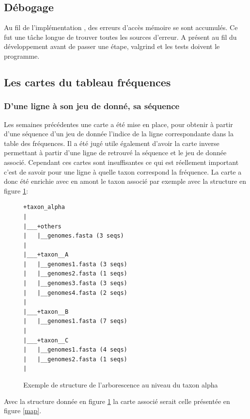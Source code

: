 \subsection{Débogage}

Au fil de l'implémentation , des erreurs d'accès mémoire se sont accumulés. Ce fut une tâche longue de trouver toutes les sources d'erreur. A présent au fil du développement avant de passer une étape, valgrind et les tests doivent le programme. 

\subsection{Les cartes du tableau fréquences}

\subsubsection{D'une ligne à son jeu de donné, sa séquence}
Les semaines précédentes une carte a été mise en place, pour obtenir à partir d'une séquence d'un jeu de donnée l'indice de la ligne correspondante dans la table des fréquences.
Il a été jugé utile également d'avoir la carte inverse permettant à partir d'une ligne de retrouvé la séquence et le jeu de donnée associé. Cependant ces cartes sont insuffisantes ce qui est réellement important c'est de savoir pour une ligne à quelle taxon correspond la fréquence. La carte a donc été enrichie avec en amont le taxon associé par exemple avec la structure en figure \ref{struct}:

  

\begin{figure}[H]
\centering
\begin{varwidth}{\linewidth}
\begin{verbatim}
+taxon_alpha
|
|___+others
|   |__genomes.fasta (3 seqs)
|   
|___+taxon__A
|   |__genomes1.fasta (3 seqs)
|   |__genomes2.fasta (1 seqs)
|   |__genomes3.fasta (3 seqs)
|   |__genomes4.fasta (2 seqs)
|   
|___+taxon__B
|   |__genomes1.fasta (7 seqs)
|   
|___+taxon__C
|   |__genomes1.fasta (4 seqs)
|   |__genomes2.fasta (1 seqs)
|

\end{verbatim}
\end{varwidth}
\caption[Structure au niveau du taxon alpha]{\label{struct}Exemple de structure de l'arborescence au niveau du taxon alpha}
\end{figure}

Avec la structure donnée en figure \ref{struct} la carte associé serait celle présentée en figure \ref{map}.

